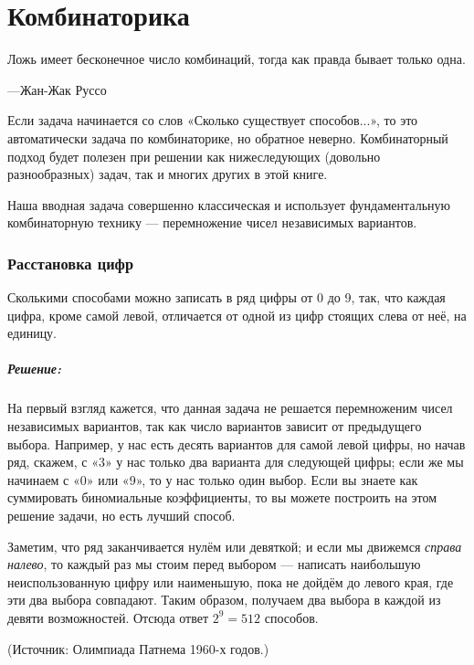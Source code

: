 \chapter*{Комбинаторика}

\setlength{\epigraphwidth}{.6\textwidth}
\epigraph{Ложь имеет бесконечное число комбинаций,
тогда как правда бывает только одна.}{---Жан-Жак Руссо}

 
 
Если задача начинается со слов «Сколько существует способов...», то это автоматически задача по комбинаторике, но обратное неверно.
Комбинаторный подход будет полезен при решении как нижеследующих (довольно разнообразных) задач, так и многих других в этой книге.

Наша вводная задача совершенно классическая и использует фундаментальную
комбинаторную технику --- перемножение чисел независимых вариантов.

\subsection*{Расстановка цифр}%

Сколькими способами можно записать в ряд цифры от 0 до 9, так, что каждая цифра, кроме самой левой, отличается от одной из цифр стоящих слева от неё, на единицу.

\paragraph{Решение:} На первый взгляд кажется, что данная задача не решается перемноженим чисел независимых вариантов, так как число вариантов зависит от предыдущего выбора.
Например, у нас есть десять вариантов для самой левой цифры,
но начав ряд, скажем, с «3» у нас только два варианта для следующей цифры; если же мы начинаем с «0» или «9», то у нас только один выбор.
Если вы знаете как суммировать биномиальные коэффициенты, то вы можете построить на этом решение задачи, но есть лучший способ.

Заметим, что ряд заканчивается нулём или девяткой; и если мы движемся \emph{справа налево}, то каждый раз мы стоим перед выбором --- написать наибольшую неиспользованную цифру или наименьшую, пока не дойдём до левого края, где эти два выбора совпадают.
Таким образом, получаем два выбора в каждой из девяти возможностей.
Отсюда ответ $2^9=512$ способов.\heart

(Источник: Олимпиада Патнема 1960-х годов.)%

